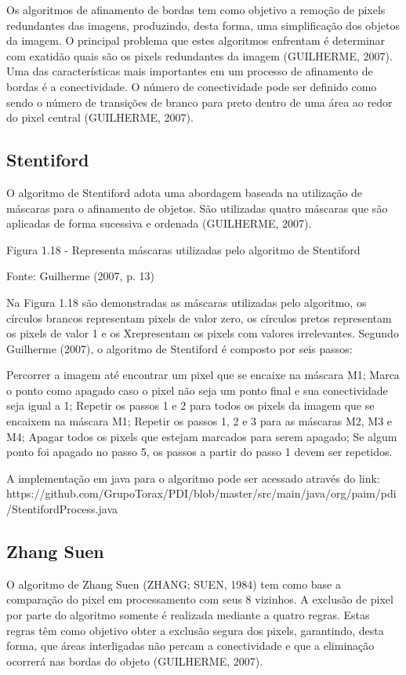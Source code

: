 \documentclass[
	12pt,				%
	oneside,			%
	a4paper,			%
	english,			%
	french,				%
	spanish,			%
	brazil,				%
	]{abntex2}
\begin{document}
Os algoritmos de afinamento de bordas tem como objetivo a remoção de pixels redundantes das imagens, produzindo, desta forma, uma simplificação dos objetos da imagem. O principal problema que estes algoritmos enfrentam é determinar com exatidão quais são os pixels redundantes da imagem (GUILHERME, 2007).
	Uma das características mais importantes em um processo de afinamento de bordas é a conectividade. O número de conectividade pode ser definido como sendo o número de transições de branco para preto dentro de uma área ao redor do pixel central (GUILHERME, 2007).
    
\subsection{Stentiford}    

	O algoritmo de Stentiford adota uma abordagem baseada na utilização de máscaras para o afinamento de objetos. São utilizadas quatro máscaras que são aplicadas de forma sucessiva e ordenada (GUILHERME, 2007).

Figura 1.18 - Representa máscaras utilizadas pelo algoritmo de Stentiford

Fonte: Guilherme (2007, p. 13)

	Na Figura 1.18 são demonstradas as máscaras utilizadas pelo algoritmo, os círculos brancos representam pixels de valor zero, os círculos pretos representam os pixels de valor 1 e os Xrepresentam os pixels com valores irrelevantes.
	Segundo Guilherme (2007), o algoritmo de Stentiford é composto por seis passos:

Percorrer a imagem até encontrar um pixel que se encaixe na máscara M1;
Marca o ponto como apagado caso o pixel não seja um ponto final e sua conectividade seja igual a 1;
Repetir os passos 1 e 2 para todos os pixels da imagem que se encaixem na máscara M1;
Repetir os passos 1, 2 e 3 para as máscaras M2, M3 e M4;
Apagar todos os pixels que estejam marcados para serem apagado;
Se algum ponto foi apagado no passo 5, os passos a partir do passo 1 devem ser repetidos.

 A implementação em java para o algoritmo pode ser acessado através do link:
https://github.com/GrupoTorax/PDI/blob/master/src/main/java/org/paim/pdi/StentifordProcess.java

\subsection{Zhang Suen}

O algoritmo de Zhang Suen (ZHANG; SUEN, 1984) tem como base a comparação do pixel em processamento com seus 8 vizinhos. A exclusão de pixel por parte do algoritmo somente é realizada mediante a quatro regras. Estas regras têm como objetivo obter a exclusão segura dos pixels, garantindo, desta forma, que áreas interligadas não percam a conectividade e que a eliminação ocorrerá nas bordas do objeto (GUILHERME, 2007).
\end{document}
